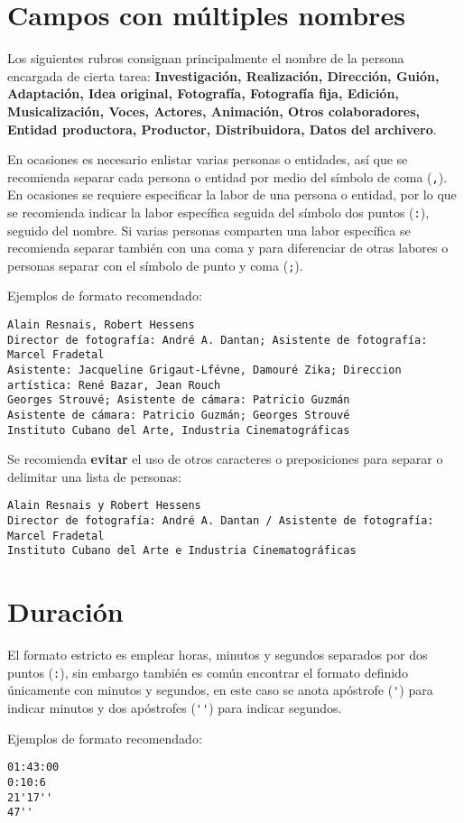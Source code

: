 \documentclass[10pt,letterpaper]{article}
\begin{document}
\section{Campos con múltiples nombres}
Los siguientes rubros consignan principalmente el nombre de la persona encargada de cierta tarea: \textbf{Investigación, Realización, Dirección, Guión, Adaptación, Idea original, Fotografía, Fotografía fija, Edición, Musicalización, Voces, Actores, Animación, Otros colaboradores, Entidad productora, Productor, Distribuidora, Datos del archivero}. 

En ocasiones es necesario enlistar varias personas o entidades, así que se recomienda separar cada persona o entidad por medio del símbolo de coma (\verb|,|). En ocasiones se requiere especificar la labor de una persona o entidad, por lo que se recomienda indicar la labor específica seguida del símbolo dos puntos (\verb|:|), seguido del nombre. Si varias personas comparten una labor específica se recomienda separar también con una coma y para diferenciar de otras labores o personas separar con el símbolo de punto y coma (\verb|;|). 

Ejemplos de formato recomendado:
{\color{Blue}
\begin{verbatim}
Alain Resnais, Robert Hessens
Director de fotografía: André A. Dantan; Asistente de fotografía: Marcel Fradetal
Asistente: Jacqueline Grigaut-Lfévne, Damouré Zika; Direccion artística: René Bazar, Jean Rouch
Georges Strouvé; Asistente de cámara: Patricio Guzmán
Asistente de cámara: Patricio Guzmán; Georges Strouvé
Instituto Cubano del Arte, Industria Cinematográficas
\end{verbatim}
}

Se recomienda \textbf{evitar} el uso de otros caracteres o preposiciones para separar o delimitar una lista de personas:
{\color{Red}
\begin{verbatim}
Alain Resnais y Robert Hessens
Director de fotografía: André A. Dantan / Asistente de fotografía: Marcel Fradetal
Instituto Cubano del Arte e Industria Cinematográficas
\end{verbatim}
}

\section{Duración}
El formato estricto es emplear horas, minutos y segundos separados por dos puntos (\verb|:|), sin embargo también es común encontrar el formato definido únicamente con minutos y segundos, en este caso se anota apóstrofe (\verb|'|) para indicar minutos y dos apóstrofes (\verb|''|) para indicar segundos.

Ejemplos de formato recomendado:
{\color{Blue}
\begin{verbatim}
01:43:00
0:10:6
21'17''
47''
\end{verbatim}
}
\end{document}
